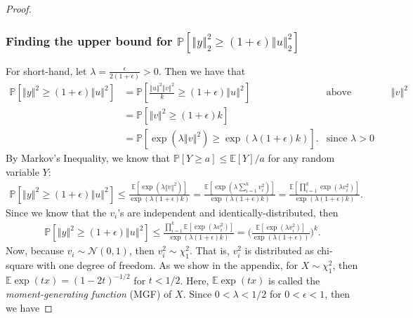 \documentclass{article}
\begin{document}
\begin{proof}
\subsubsection{Finding the upper bound for  $\mathbb{P} \left[ \left\Vert y \right\Vert^2_2 \geq (1+\epsilon) \left\Vert u \right\Vert^2_2 \right]$}
For short-hand, let $\lambda = \frac{\epsilon}{2(1+\epsilon)} > 0.$ Then we have that
\begin{align*}
\mathbb{P}[\left\Vert y \right\Vert^2 \geq (1+\epsilon) \left\Vert u \right\Vert^2] & = \mathbb{P} \left[\frac{\left\Vert u \right\Vert^2 \left\Vert v \right\Vert^2}{k} \geq (1+\epsilon) \left\Vert u \right\Vert^2 \right] & \text{above expression for $\left\Vert v \right\Vert^2 $}\\
& = \mathbb{P} \left[ \left\Vert v \right\Vert^2 \geq (1+\epsilon) k \right] \\
& = \mathbb{P}\left[ \exp(\lambda \left\Vert v \right\Vert^2) \geq \exp(\lambda (1+\epsilon) k) \right]. & \text{since $\lambda > 0$}
\end{align*}
By Markov's Inequality, we know that $\mathbb{P}[Y \geq a] \leq \mathbb{E}[Y]/a$ for any random variable $Y$:
\begin{align*}
\mathbb{P} \left[ \left\Vert y \right\Vert^2 \geq (1+\epsilon) \left\Vert u \right\Vert^2 \right] \leq \frac{\mathbb{E}\left[\exp(\lambda \left\Vert v \right\Vert^2) \right] }{ \exp(\lambda (1+\epsilon) k)} = \frac{\mathbb{E}\left[\exp(\lambda \sum_{i=1}^k v_i^2) \right]}{ \exp(\lambda (1+\epsilon) k)} = \frac{\mathbb{E}\left[\prod_{i=1}^k \exp(\lambda  v_i^2) \right]}{ \exp(\lambda (1+\epsilon) k)}.
\end{align*}
Since we know that the $v_i$'s are independent and identically-distributed, then
\begin{align*}
\mathbb{P} \left[ \left\Vert y \right\Vert^2 \geq (1+\epsilon) \left\Vert u \right\Vert^2 \right] \leq \frac{\prod^k_{i=1} \mathbb{E} \left[ \exp(\lambda v_i^2) \right]}{\exp(\lambda (1+\epsilon) k)} = \bigg (\frac{ \mathbb{E} \left[\exp(\lambda v_i^2) \right] }{ \exp(\lambda (1+\epsilon))} \bigg)^k.
\end{align*}
Now, because $v_i \sim \mathcal{N}(0, 1)$, then $v_i^2 \sim \chi_1^2$. That is, $v_i^2$ is distributed as chi-square with one degree of freedom. As we show in the appendix, for $X \sim \chi_1^2$, then $\mathbb{E}\exp(tx) = (1-2t)^{-1/2}$ for $t < 1/2$. Here, $\mathbb{E}\exp(tx)$ is called the \textit{moment-generating function} (MGF) of $X$. Since $0< \lambda < 1/2$ for $0 < \epsilon < 1$, then we have

\end{proof}
\end{document}
